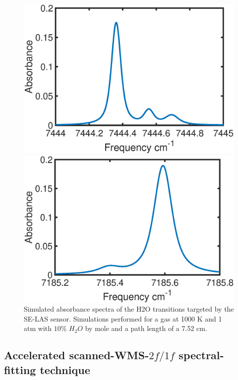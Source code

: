 \begin{figure}  
\begin{minipage}[h]{0.5\linewidth}  
\centering  
\includegraphics[width=1\textwidth]{fig/ch4_fig3_1.eps}  
\end{minipage}%
\begin{minipage}[h]{0.5\linewidth}  
\centering  
\includegraphics[width=1\textwidth]{fig/ch4_fig3_2.eps}  
\end{minipage} 
\caption{Simulated absorbance spectra of the H2O transitions targeted by the SE-LAS sensor. Simulations performed for a gas at 1000 K and 1 atm with $10\%$ $H_2O$ by mole and a path length of a 7.52 cm.}
    \label{fig:ch4_3}
\end{figure} 


\subsection{Accelerated scanned-WMS-{$2f/1f$} spectral-fitting technique}

